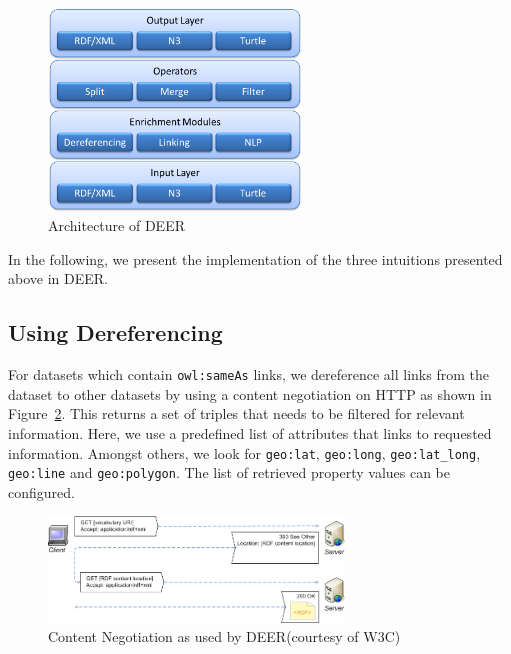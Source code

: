 \documentclass[a4paper,twoside,bibtotoc,abstracton,12pt,BCOR=15mm]{article}
\newcommand{\geolift}{\textsc{DEER}\xspace}
\begin{document}
\begin{figure}[ht!]
			\centering
			\includegraphics[width = 0.6\textwidth]{images/geolift_architecture.png}
			\caption{Architecture of \geolift}
			\label{fig:architecture}
		\end{figure}

In the following, we present the implementation of the three intuitions presented above in \geolift.
\subsection{Using Dereferencing}
For datasets which contain \texttt{owl:sameAs} links, we dereference all links from the dataset to other datasets by using a content negotiation on HTTP as shown in Figure~\ref{fig:contentNegotiation}.
This returns a set of triples that needs to be filtered for relevant information.
Here, we use a predefined list of attributes that links to requested information.
Amongst others, we look for \texttt{geo:lat}, \texttt{geo:long}, \texttt{geo:lat\_long}, \texttt{geo:line} and \texttt{geo:polygon}.
The list of retrieved property values can be configured.

\begin{figure}[htb]
\centering
\includegraphics[width=0.7\textwidth]{images/contentnegotiation}
\caption{Content Negotiation as used by \geolift (courtesy of W3C)}
\label{fig:contentNegotiation}
\end{figure}
\end{document}
